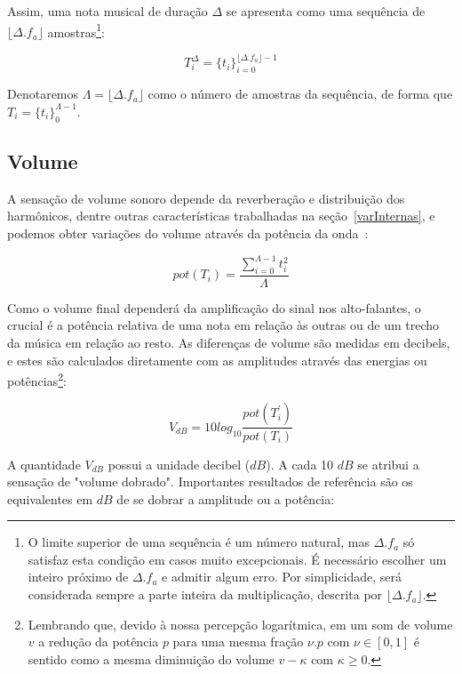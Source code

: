 Assim, uma nota musical de duração $\Delta$
se apresenta como uma sequência de $ \lfloor \Delta . f_a \rfloor $ amostras\footnote{O
limite superior de uma sequência é um número natural, mas $ \Delta . f_a $
só satisfaz esta condição em casos muito excepcionais. É necessário
escolher um inteiro próximo de $\Delta . f_a$ e admitir algum erro. Por simplicidade, será considerada sempre a parte inteira da multiplicação, descrita por $\lfloor \Delta . f_a \rfloor$.}:

\begin{equation}\label{eq:dur}
T_{i}^{\Delta}={\{t_i\}}_{i=0}^{\lfloor \Delta . f_a \rfloor -1}
\end{equation}

Denotaremos $\Lambda = \lfloor \Delta . f_a \rfloor$ como o número de amostras da sequência, de forma que $T_i=\{t_i\}_0^{\Lambda-1}$.

\subsection{Volume}
A sensação de volume sonoro depende da reverberação e distribuição dos harmônicos, dentre outras características trabalhadas na seção~\ref{varInternas}, e podemos obter variações do volume através da potência da onda~\cite{Chowning}:

\begin{equation}\label{eq:potencia}
pot(T_i)=\frac{\sum_{i=0}^{\Lambda -1} t_i^2}{\Lambda}
\end{equation} 

Como o volume final dependerá da amplificação do sinal nos alto-falantes, o crucial é a potência relativa de uma nota em relação às outras ou de um trecho da música em relação ao resto. As diferenças de volume são medidas em decibels, e estes são
calculados diretamente com as amplitudes através das energias ou potências\footnote{Lembrando que, devido à nossa percepção logarítmica,
em um som de volume $v$ a redução da potência $p$ para uma mesma fração $\nu . p $ 
com $\nu \in [0,1]$ é sentido como a mesma diminuição do volume $v-\kappa$ com $\kappa \geq 0$.}:

\begin{equation}\label{decibels}
V_{dB}=10log_{10}\frac{pot(T^{'}_i)}{pot(T_i)}
\end{equation}

A quantidade $V_{dB}$ possui a unidade decibel ($dB$). A cada 10 $dB$ se atribui
a sensação de "volume dobrado". Importantes resultados de referência são os equivalentes em $dB$ de se dobrar
a amplitude ou a potência:

